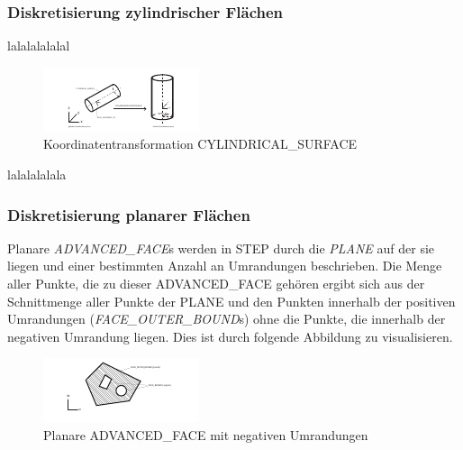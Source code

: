 \subsubsection{Diskretisierung zylindrischer Flächen}

lalalalalalal

\begin{figure}[h]
	\centering
	
	\includegraphics[width=0.7\linewidth]{img/trafozylinder.pdf}
	
	\caption{Koordinatentransformation CYLINDRICAL\_SURFACE}
	\label{fig:trafozylinder}
	
\end{figure}

lalalalalala

\subsubsection{Diskretisierung planarer Flächen}

Planare \textit{ADVANCED\_FACE}s werden in STEP durch die \textit{PLANE} auf der sie liegen und einer bestimmten Anzahl an Umrandungen beschrieben. Die Menge aller Punkte, die zu dieser ADVANCED\_FACE gehören ergibt sich aus der Schnittmenge aller Punkte der PLANE und den Punkten innerhalb der positiven Umrandungen (\textit{FACE\_OUTER\_BOUND}s) ohne die Punkte, die innerhalb der negativen Umrandung liegen. 
Dies ist durch folgende Abbildung zu visualisieren.

\begin{figure}[h]
	\centering
	
	\includegraphics[width=0.7\linewidth]{img/posnegbounds.pdf}
	
	\caption{Planare ADVANCED\_FACE mit negativen Umrandungen}
	\label{fig:posnegbounds}
	
\end{figure}

